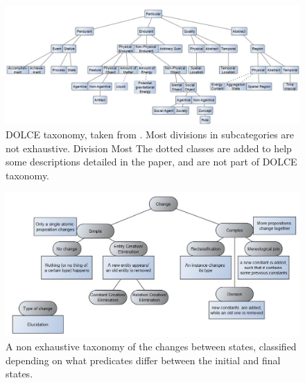 \documentclass[sw]{iosart2x}
\newcommand{\DOLCE}{\textsc{DOLCE}\xspace} %
\begin{document}
\begin{figure}
  \centering
  \includegraphics[width=\textwidth]{DOLCE-taxav2.JPG}
  \caption{\label{fig:DOLCE-taxa} \DOLCE taxonomy, taken from \cite{borgoDOLCEDescriptiveOntology2022}. Most divisions in subcategories are not exhaustive. Division Most The dotted classes are added to help some descriptions detailed in the paper, and are not part of \DOLCE taxonomy.}
\end{figure}
\begin{figure}
  \centering
  \includegraphics[width=\textwidth]{onto-func-logic.JPG}
  \caption{\label{fig:onto-func-logic} A non exhaustive taxonomy of the changes between states, classified depending on what predicates differ between the initial and final states.}
\end{figure}
\end{document}
